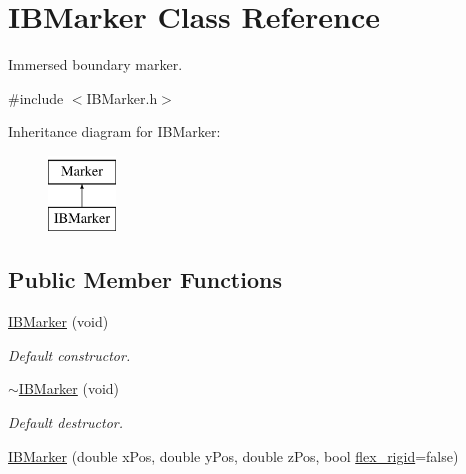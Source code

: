 \hypertarget{class_i_b_marker}{}\section{I\+B\+Marker Class Reference}
\label{class_i_b_marker}


Immersed boundary marker.  




{\ttfamily \#include $<$I\+B\+Marker.\+h$>$}

Inheritance diagram for I\+B\+Marker\+:\begin{figure}[H]
\begin{center}
\leavevmode
\includegraphics[height=2.000000cm]{class_i_b_marker}
\end{center}
\end{figure}
\subsection*{Public Member Functions}
\begin{DoxyCompactItemize}
\item 
\hyperlink{class_i_b_marker_ab45e9679ae96b75ab7655e738807bb41}{I\+B\+Marker} (void)
\begin{DoxyCompactList}\small\item\em Default constructor. \end{DoxyCompactList}\item 
\hyperlink{class_i_b_marker_a0f3e177c42c3d616a2bbf96c0a9c1099}{$\sim$\+I\+B\+Marker} (void)
\begin{DoxyCompactList}\small\item\em Default destructor. \end{DoxyCompactList}\item 
\hyperlink{class_i_b_marker_ae3a7dc30b6910d1aa405810a2e3956b3}{I\+B\+Marker} (double x\+Pos, double y\+Pos, double z\+Pos, bool \hyperlink{class_i_b_marker_a826fd907814ce9c6e40bcbdbd359ec7e}{flex\+\_\+rigid}=false)
\end{DoxyCompactItemize}
